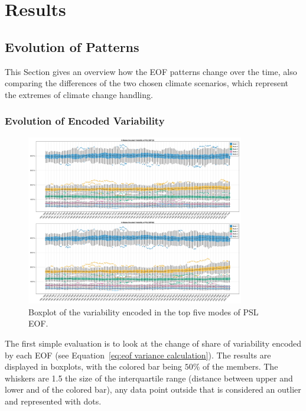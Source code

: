 \chapter{Results}
\label{ch:results}


\section{Evolution of Patterns}
\label{sec:pattern evolution}

This Section gives an overview how the EOF patterns change over the time, also comparing the differences of the two chosen climate scenarios, which represent the extremes of climate change handling.   

\subsection{Evolution of Encoded Variability}



\begin{figure}[htb]
  \begin{center}
    \includegraphics[width=0.85\textwidth]{figures/mode_variability_psl_50seasons.png}
  \end{center}
  \caption{Boxplot of the variability encoded in the top five modes of PSL EOF.}\label{fig:psl mode variability}
\end{figure}

The first simple evaluation is to look at the change of share of variability encoded by each EOF (see Equation~\ref{eq:eof variance calculation}). 
The results are displayed in boxplots, with the colored bar being $50\%$  of the members. 
The whiskers are 1.5 the size of the interquartile range (distance between upper and lower and of the colored bar), any data point outside that is considered an outlier and represented with dots. 


